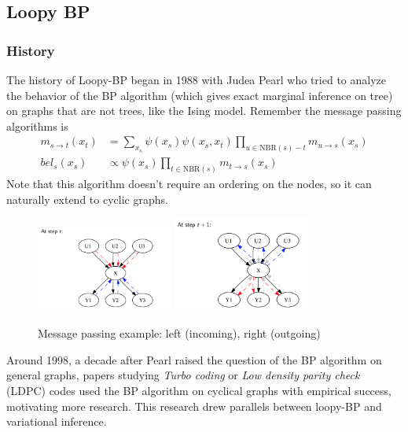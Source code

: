 \documentclass{article}
\begin{document}

\subsection{Loopy BP}
\subsubsection{History} The history of Loopy-BP began in 1988 with Judea Pearl who tried to analyze the behavior of the BP algorithm (which gives exact marginal inference on tree) on graphs that are not trees, like the Ising model. Remember the message passing algorithms is
\begin{align*}
	m_{s\to t}(x_t) &= \sum_{x_s}\psi(x_s)\psi(x_s,x_t)\prod_{u\in \text{NBR}(s)-t}m_{u\to s}(x_s)\\
	bel_s(x_s) &\propto \psi(x_s)\prod_{t\in \text{NBR}(s)}m_{t\to s}(x_s)
\end{align*}
Note that this algorithm doesn't require an ordering on the nodes, so it can naturally extend to cyclic graphs.

\FloatBarrier
\begin{figure}
\center
\includegraphics[width=0.4\textwidth]{time_t}
\includegraphics[width=0.4\textwidth]{time_t1}
\caption{Message passing example: left (incoming), right (outgoing)}
\end{figure}

Around 1998, a decade after Pearl raised the question of the BP algorithm on general graphs, papers studying \emph{Turbo coding} or \emph{Low density parity check} (LDPC) codes used the BP algorithm on cyclical graphs with empirical success, motivating more research. This research drew parallels between loopy-BP and variational inference.
\end{document}

